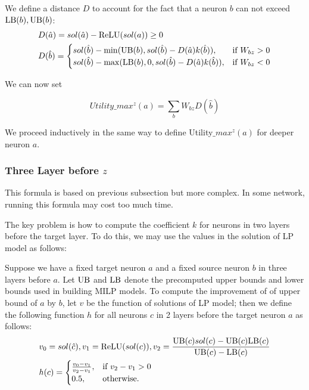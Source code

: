 We define a distance $D$ to account for the fact that a neuron $b$ 
can not exceed $\mathrm{LB}(b),\mathrm{UB}(b)$:
	\begin{align*}
		&D(\hat{a}) = sol(\hat{a}) - \mathrm{ReLU}(sol(a)) \geq 0\\
			&D(\hat{b}) =
		\begin{cases}
			sol(\hat{b}) - \min(\mathrm{UB}(b), sol(\hat{b}) - D(\hat{a}) k(\hat{b})), & \text{if }  W_{bz} > 0 \\
			sol(\hat{b}) - \max(\mathrm{LB}(b), 0, sol(\hat{b}) -D(\hat{a}) k(\hat{b})), & \text{if }W_{bz} < 0\\
		\end{cases}
		\end{align*}

We can now set 

$$ Utility\_max^z(a) = \sum_b W_{bz} D(\hat{b})$$
 
We proceed inductively in the same way to define Utility$\_max^z(a)$ for deeper neuron $a$.

\iffalse
\subsubsection*{Three Layer before  $z$} 

This formula is based on previous subsection but more complex. In some network, running this formula may cost too much time. 

The key problem is how to compute the coefficient $k$ for neurons in two layers before the target layer. To do this, we may use the values in the solution of LP model as follows:

\begin{definition}\label{3layer}
	Suppose we have a fixed target neuron $a$ and a fixed source neuron $b$ in three layers before $a$. Let $\mathrm{UB}$ and $\mathrm{LB}$ denote the precomputed upper bounds and lower bounds used in building MILP models. To compute the improvement of of upper bound of $a$ by $b$, let $v$ be the function of solutions of LP model; then we define the following function $h$ for all neurons $c$ in 2 layers before the target neuron $a$ as follows:
	\begin{align}
		&v_0 = sol(\hat{c}), v_1 = \mathrm{ReLU}(sol(c)), v_2 = \frac{\mathrm{UB}(c)sol(c)-\mathrm{UB}(c)\mathrm{LB}(c)}{\mathrm{UB}(c)-\mathrm{LB}(c)}\\
		&h(c) =
		\begin{cases}
			\frac{v_0-v_1}{v_2-v_1}, & \text{if } v_2-v_1 > 0\\
			0.5, & \text{otherwise.}
		\end{cases}
	\end{align} 
\end{definition} 

